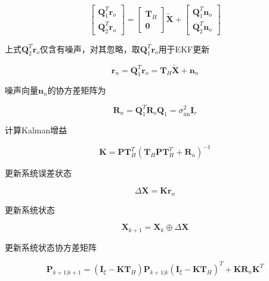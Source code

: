 \documentclass[12pt,a4paper]{article}
\begin{document}
\begin{equation}
\left[\begin{array}{l}
{\mathbf{Q}_{1}^{T} \mathbf{r}_{o}} \\ {\mathbf{Q}_{2}^{T} \mathbf{r}_{o}}\end{array}\right]=\left[\begin{array}{c}{\mathbf{T}_{H}} \\ {\mathbf{0}}\end{array}\right] \tilde{\mathbf{X}}+\left[\begin{array}{l}{\mathbf{Q}_{1}^{T} \mathbf{n}_{o}} \\ {\mathbf{Q}_{2}^{T} \mathbf{n}_{o}}\end{array}\right]
\end{equation}

上式${\mathbf{Q}_{2}^{T} \mathbf{r}_{o}}$仅含有噪声，对其忽略，取$\mathbf{Q}_{1}^{T} \mathbf{r}_{o}$用于EKF更新

\begin{equation}
\mathbf{r}_{n}=\mathbf{Q}_{1}^{T} \mathbf{r}_{o}=\mathbf{T}_{H} \widetilde{\mathbf{X}}+\mathbf{n}_{n}
\end{equation}

噪声向量$\mathbf{n}_{n}$的协方差矩阵为

\begin{equation}
\mathbf{R}_{n}=
\mathbf{Q}_{1}^{T} \mathbf{R}_{o} \mathbf{Q}_{1}=\sigma_{\mathrm{im}}^{2} \mathbf{I}_{r}
\end{equation}

计算Kalman增益

\begin{equation}
\mathbf{K}=\mathbf{P} \mathbf{T}_{H}^{T}\left(\mathbf{T}_{H} \mathbf{P} \mathbf{T}_{H}^{T}+\mathbf{R}_{n}\right)^{-1}
\end{equation}

更新系统误差状态

\begin{equation}
\Delta \mathbf{X}=\mathbf{K r}_{n}
\end{equation}

更新系统状态

\begin{equation}
\mathbf{X}_{k+1} = \mathbf{X}_k \oplus \Delta \mathbf{X}
\end{equation}

更新系统状态协方差矩阵

\begin{equation}
\mathbf{P}_{k+1 | k+1}=\left(\mathbf{I}_{\xi}-\mathbf{K} \mathbf{T}_{H}\right) \mathbf{P}_{k+1 | k}\left(\mathbf{I}_{\xi}-\mathbf{K} \mathbf{T}_{H}\right)^{T}+\mathbf{K} \mathbf{R}_{n} \mathbf{K}^{T}
\end{equation}

\newpage


\end{document}
